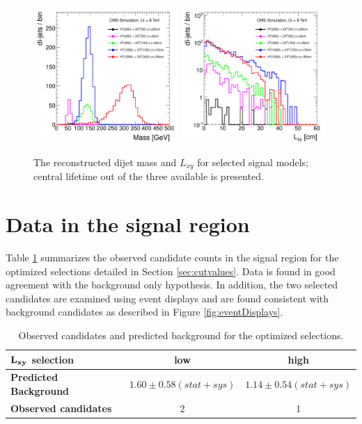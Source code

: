 \begin{figure}[htbp]
\centering
\includegraphics[width=0.49\textwidth]{plots/signal/mass.pdf}
\includegraphics[width=0.49\textwidth]{plots/signal/Lxy.pdf}
\caption{The reconstructed dijet mass and $L_{xy}$ for selected signal models; central lifetime out of the three available is presented.\label{fig:signal}}
\end{figure}

\section{Data in the signal region}
\label{sec:fullunblinding}

Table \ref{tab:fullunblinding} summarizes the observed candidate counts in the signal region for the optimized 
selections detailed in Section \ref{sec:cutvalues}. Data is found in good agreement with the 
background only hypothesis. In addition, the two selected candidates are examined using event displays
and are found consistent with background candidates as described in Figure \ref{fig:eventDisplays}.  

\begin{table}[htbp]
\centering
\begin{tabular}{|l|c|c|}
\hline
$\bf L_{xy}$ \bf selection & \bf low & \bf high \\
\hline
\bf Predicted Background & $ 1.60\pm0.58(stat+sys)$ & $ 1.14\pm0.54(stat+sys)$ \\
\hline
\bf Observed candidates & 2 & 1 \\ 
\hline
\end{tabular}
\caption{Observed candidates and predicted background for the optimized selections.\label{tab:fullunblinding}}
\end{table}

